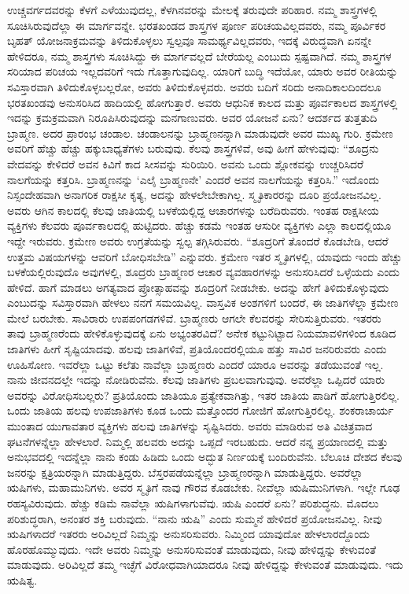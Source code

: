 ಉಚ್ಚವರ್ಗದವರನ್ನು ಕೆಳಗೆ ಎಳೆಯುವುದಲ್ಲ, ಕೆಳಗಿನವರನ್ನು ಮೇಲಕ್ಕೆ ತರುವುದೇ ಪರಿಹಾರ. ನಮ್ಮ ಶಾಸ್ತ್ರಗಳಲ್ಲಿ ಸೂಚಿಸಿರುವುದೆಲ್ಲಾ ಈ ಮಾರ್ಗವನ್ನೇ. ಭರತಖಂಡದ ಶಾಸ್ತ್ರಗಳ ಪೂರ್ಣ ಪರಿಚಯವಿಲ್ಲದವರು, ನಮ್ಮ ಪೂರ್ವಿಕರ ಬೃಹತ್​ ಯೋಜನಾಕ್ರಮವನ್ನು ತಿಳಿದುಕೊಳ್ಳಲು ಸ್ವಲ್ಪವೂ ಸಾಮರ್ಥ್ಯವಿಲ್ಲದವರು, ಇದಕ್ಕೆ ವಿರುದ್ಧವಾಗಿ ಏನನ್ನೇ ಹೇಳಿದರೂ, ನಮ್ಮ ಶಾಸ್ತ್ರಗಳು ಸೂಚಿಸಿದ್ದು ಈ ಮಾರ್ಗವಲ್ಲದೆ ಬೇರೆಯಲ್ಲ ಎಂಬುದು ಸ್ಪಷ್ಟವಾಗಿದೆ. ನಮ್ಮ ಶಾಸ್ತ್ರಗಳ ಸರಿಯಾದ ಪರಿಚಯ ಇಲ್ಲದವರಿಗೆ ಇದು ಗೊತ್ತಾಗುವುದಿಲ್ಲ. ಯಾರಿಗೆ ಬುದ್ಧಿ ಇದೆಯೋ, ಯಾರು ಅವರ ರೀತಿಯನ್ನು ಸವಿಸ್ತಾರವಾಗಿ ತಿಳಿದುಕೊಳ್ಳಬಲ್ಲರೋ, ಅವರು ತಿಳಿದುಕೊಳ್ಳವರು. ಅವರು ಬದಿಗೆ ಸರಿದು ಅನಾದಿಕಾಲದಿಂದಲೂ ಭರತಖಂಡವು ಅನುಸರಿಸಿದ ಹಾದಿಯಲ್ಲಿ ಹೋಗುತ್ತಾರೆ. ಅವರು ಆಧುನಿಕ ಕಾಲದ ಮತ್ತು ಪೂರ್ವಕಾಲದ ಶಾಸ್ತ್ರಗಳಲ್ಲಿ ಇದನ್ನು ಕ್ರಮಕ್ರಮವಾಗಿ ನಿರೂಪಿಸಿರುವುದನ್ನು ಮನಗಾಣುವರು. ಅವರ ಯೋಜನೆ ಏನು? ಆದರ್ಶದ ತುತ್ತತುದಿ ಬ್ರಾಹ್ಮಣ. ಅದರ ಪ್ರಾರಂಭ ಚಂಡಾಲ. ಚಂಡಾಲನನ್ನು ಬ್ರಾಹ್ಮಣನನ್ನಾಗಿ ಮಾಡುವುದೇ ಅವರ ಮುಖ್ಯ ಗುರಿ. ಕ್ರಮೇಣ ಅವರಿಗೆ ಹೆಚ್ಚು ಹೆಚ್ಚು ಹಕ್ಕುಬಾಧ್ಯತೆಗಳು ಬರುವುವು. ಕೆಲವು ಶಾಸ್ತ್ರಗಳಿವೆ, ಅವು ಹೀಗೆ ಹೇಳುವುವು: “ಶೂದ್ರನು ವೇದವನ್ನು ಕೇಳಿದರೆ ಅವನ ಕಿವಿಗೆ ಕಾದ ಸೀಸವನ್ನು ಸುರಿಯಿರಿ. ಅವನು ಒಂದು ಶ್ಲೋಕವನ್ನು ಉಚ್ಚರಿಸಿದರೆ ನಾಲಗೆಯನ್ನು ಕತ್ತರಿಸಿ. ಬ್ರಾಹ್ಮಣನನ್ನು ‘ಎಲೈ ಬ್ರಾಹ್ಮಣನೇ’ ಎಂದರೆ ಅವನ ನಾಲಗೆಯನ್ನು ಕತ್ತರಿಸಿ.” ಇದೊಂದು ನಿಸ್ಸಂದೇಹವಾಗಿ ಅನಾಗರಿಕ ರಾಕ್ಷಸೀ ಕೃತ್ಯ, ಅದನ್ನು ಹೇಳಲೇಬೇಕಾಗಿಲ್ಲ. ಸ್ಮೃತಿಕಾರರನ್ನು ದೂರಿ ಪ್ರಯೋಜನವಿಲ್ಲ. ಅವರು ಆಗಿನ ಕಾಲದಲ್ಲಿ ಕೆಲವು ಜಾತಿಯಲ್ಲಿ ಬಳಕೆಯಲ್ಲಿದ್ದ ಆಚಾರಗಳನ್ನು ಬರೆದಿರುವರು. ಇಂತಹ ರಾಕ್ಷಸೀಯ ವ್ಯಕ್ತಿಗಳು ಕೆಲವರು ಪೂರ್ವಕಾಲದಲ್ಲಿ ಹುಟ್ಟಿದರು. ಹೆಚ್ಚು ಕಡಮೆ ಇಂತಹ ಆಸುರೀ ವ್ಯಕ್ತಿಗಳು ಎಲ್ಲಾ ಕಾಲದಲ್ಲಿಯೂ ಇದ್ದೇ ಇರುವರು. ಕ್ರಮೇಣ ಅವರು ಉಗ್ರತೆಯನ್ನು ಸ್ವಲ್ಪ ತಗ್ಗಿಸಿರುವರು. “ಶೂದ್ರರಿಗೆ ತೊಂದರೆ ಕೊಡಬೇಡಿ, ಆದರೆ ಉತ್ತಮ ವಿಷಯಗಳನ್ನು ಆವರಿಗೆ ಬೋಧಿಸಬೇಡಿ” ಎನ್ನುವರು. ಕ್ರಮೇಣ ಇತರ ಸ್ಮೃತಿಗಳಲ್ಲಿ, ಯಾವುದು ಇಂದು ಹೆಚ್ಚು ಬಳಕೆಯಲ್ಲಿರುವುದೊ ಅವುಗಳಲ್ಲಿ, ಶೂದ್ರರು ಬ್ರಾಹ್ಮಣರ ಆಚಾರ ವ್ಯವಹಾರಗಳನ್ನು ಅನುಸರಿಸಿದರೆ ಒಳ್ಳೆಯದು ಎಂದು ಹೇಳಿದೆ. ಹಾಗೆ ಮಾಡಲು ಅಗತ್ಯವಾದ ಪ್ರೋತ್ಸಾಹವನ್ನು ಶೂದ್ರರಿಗೆ ನೀಡಬೇಕು. ಅದನ್ನು ಹೇಗೆ ತಿಳಿದುಕೊಳ್ಳುವುದು ಎಂಬುದನ್ನು ಸವಿಸ್ತಾರವಾಗಿ ಹೇಳಲು ನನಗೆ ಸಮಯವಿಲ್ಲ. ವಾಸ್ತವಿಕ ಅಂಶಗಳಿಗೆ ಬಂದರೆ, ಈ ಜಾತಿಗಳೆಲ್ಲಾ ಕ್ರಮೇಣ ಮೇಲೆ ಬರಬೇಕು. ಸಾವಿರಾರು ಉಪಪಂಗಡಗಳಿವೆ. ಬ್ರಾಹ್ಮಣರು ಆಗಲೇ ಕೆಲವರನ್ನು ಸೇರಿಸುತ್ತಿರುವರು. ಇತರರು ತಾವು ಬ್ರಾಹ್ಮಣರೆಂದು ಹೇಳಿಕೊಳ್ಳುವುದಕ್ಕೆ ಏನು ಅಭ್ಯಂತರವಿದೆ? ಅನೇಕ ಕಟ್ಟುನಿಟ್ಟಾದ ನಿಯಮಾವಳಿಗಳಿಂದ ಕೂಡಿದ ಜಾತಿಗಳು ಹೀಗೆ ಸೃಷ್ಟಿಯಾದವು. ಹಲವು ಜಾತಿಗಳಿವೆ, ಪ್ರತಿಯೊಂದರಲ್ಲಿಯೂ ಹತ್ತು ಸಾವಿರ ಜನರಿರುವರು ಎಂದು ಊಹಿಸೋಣ. ಇವರೆಲ್ಲಾ ಒಟ್ಟು ಕಲೆತು ನಾವೆಲ್ಲಾ ಬ್ರಾಹ್ಮಣರು ಎಂದರೆ ಯಾರೂ ಅವರನ್ನು ತಡೆಯುವಂತೆ ಇಲ್ಲ. ನಾನು ಜೀವನದಲ್ಲೇ ಇದನ್ನು ನೋಡಿರುವೆನು. ಕೆಲವು ಜಾತಿಗಳು ಪ್ರಬಲವಾಗುವುವು. ಅವರೆಲ್ಲಾ ಒಪ್ಪಿದರೆ ಯಾರು ಅವರನ್ನು ವಿರೋಧಿಸಬಲ್ಲರು? ಪ್ರತಿಯೊಂದು ಜಾತಿಯೂ ಪ್ರತ್ಯೇಕವಾಗಿತ್ತು, ಇತರ ಜಾತಿಯ ಪಾಡಿಗೆ ಹೋಗುತ್ತಿರಲಿಲ್ಲ. ಒಂದು ಜಾತಿಯ ಹಲವು ಉಪಜಾತಿಗಳು ಕೂಡ ಒಂದು ಮತ್ತೊಂದರ ಗೋಜಿಗೆ ಹೋಗುತ್ತಿರಲಿಲ್ಲ. ಶಂಕರಾಚಾರ್ಯ ಮುಂತಾದ ಯುಗಾವತಾರ ವ್ಯಕ್ತಿಗಳು ಹಲವು ಜಾತಿಗಳನ್ನು ಸೃಷ್ಟಿಸಿದರು. ಅವರು ಮಾಡಿರುವ ಅತಿ ವಿಚಿತ್ರವಾದ ಘಟನೆಗಳನ್ನೆಲ್ಲಾ ಹೇಳಲಾರೆ. ನಿಮ್ಮಲ್ಲಿ ಹಲವರು ಅದನ್ನು ಒಪ್ಪದೆ ಇರಬಹುದು. ಆದರೆ ನನ್ನ ಪ್ರಯಾಣದಲ್ಲಿ ಮತ್ತು ಅನುಭವದಲ್ಲಿ ಇದನ್ನೆಲ್ಲಾ ನಾನು ಕಂಡು ಹಿಡಿದು ಒಂದು ಅದ್ಭುತ ನಿರ್ಣಯಕ್ಕೆ ಬಂದಿರುವೆನು. ಬೆಲೂಚಿ ದೇಶದ ಕೆಲವು ಜನರನ್ನು ಕ್ಷತ್ರಿಯರನ್ನಾಗಿ ಮಾಡುತ್ತಿದ್ದರು. ಬೆಸ್ತರಪಡೆಯನ್ನೆಲ್ಲಾ ಬ್ರಾಹ್ಮಣರನ್ನಾಗಿ ಮಾಡುತ್ತಿದ್ದರು. ಅವರೆಲ್ಲಾ ಋಷಿಗಳು, ಮಹಾಮುನಿಗಳು. ಅವರ ಸ್ಮೃತಿಗೆ ನಾವು ಗೌರವ ಕೊಡಬೇಕು. ನೀವೆಲ್ಲಾ ಋಷಿಮುನಿಗಳಾಗಿ. ಇಲ್ಲೇ ಗೂಢ ರಹಸ್ಯವಿರುವುದು. ಹೆಚ್ಚು ಕಡಿಮೆ ನಾವೆಲ್ಲಾ ಋಷಿಗಳಾಗುವೆವು. ಋಷಿ ಎಂದರೆ ಏನು? ಪರಿಶುದ್ಧನು. ಮೊದಲು ಪರಿಶುದ್ಧರಾಗಿ, ಅನಂತರ ಶಕ್ತಿ ಬರುವುದು. “ನಾನು ಋಷಿ” ಎಂದು ಸುಮ್ಮನೆ ಹೇಳಿದರೆ ಪ್ರಯೋಜನವಿಲ್ಲ. ನೀವು ಋಷಿಗಳಾದರೆ ಇತರರು ಅರಿವಿಲ್ಲದೆ ನಿಮ್ಮನ್ನು ಅನುಸರಿಸುವರು. ನಿಮ್ಮಿಂದ ಯಾವುದೋ ಹೇಳಲಾರದ್ದೊಂದು ಹೊರಹೊಮ್ಮುವುದು. ಇದೇ ಅವರು ನಿಮ್ಮನ್ನು ಅನುಸರಿಸುವಂತೆ ಮಾಡುವುದು, ನೀವು ಹೇಳಿದ್ದನ್ನು ಕೇಳುವಂತೆ ಮಾಡುವುದು. ಅರಿವಿಲ್ಲದೆ ತಮ್ಮ ಇಚ್ಛೆಗೆ ವಿರೋಧವಾಗಿಯಾದರೂ ನೀವು ಹೇಳಿದ್ದನ್ನು ಕೇಳುವಂತೆ ಮಾಡುವುದು. ಇದು ಋಷಿತ್ವ.

